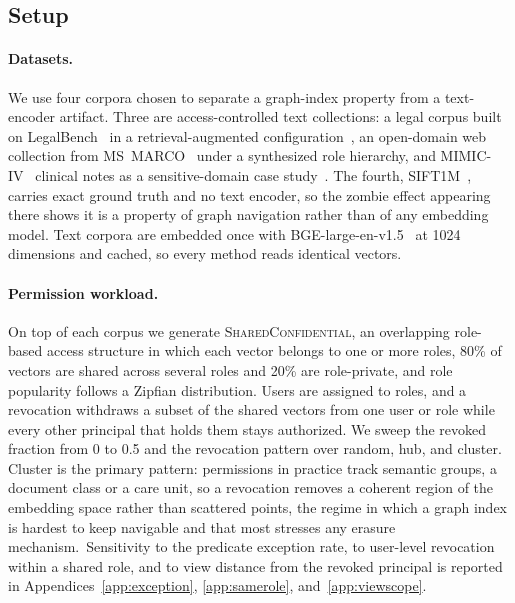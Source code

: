 \documentclass[sigconf, nonacm, review]{acmart}
\newif\ifextended\extendedtrue %
\begin{document}
\subsection{Setup}
\label{sec:eval-setup}

\paragraph{Datasets.}
We use four corpora chosen to separate a graph-index property from a
text-encoder artifact. Three are access-controlled text collections: a
legal corpus built on LegalBench~\cite{DBLP:conf/nips/GuhaNHRCKCPWRZT23} in
a retrieval-augmented configuration~\cite{DBLP:conf/icail/BarronESMA25}, an
open-domain web collection from MS~MARCO~\cite{DBLP:conf/sigir/CraswellMYCL21}
under a synthesized role hierarchy, and
MIMIC-IV~\cite{PhysioNet-mimiciv-3.1,DBLP:journals/scientificdata/JohnsonBSGSHPHMGLCM23}
clinical notes as a sensitive-domain case
study~\cite{DBLP:journals/jhir/SivarajkumarMORHLHVW24}. The fourth,
SIFT1M~\cite{DBLP:journals/pami/JegouDS11}, carries exact ground truth and
no text encoder, so the zombie effect appearing there shows it is a property
of graph navigation rather than of any embedding model. Text corpora are
embedded once with BGE-large-en-v1.5~\cite{DBLP:conf/sigir/XiaoLZMLN24} at 1024
dimensions and cached, so every method reads identical vectors.

\paragraph{Permission workload.}
On top of each corpus we generate \textsc{SharedConfidential}, an
overlapping role-based access structure in which each vector belongs to one
or more roles, 80\% of vectors are shared across several roles and 20\% are
role-private, and role popularity follows a Zipfian distribution. Users are
assigned to roles, and a revocation withdraws a subset of the shared vectors
from one user or role while every other principal that holds them stays
authorized. We sweep the revoked fraction from 0 to 0.5 and the revocation
pattern over random, hub, and cluster. Cluster is the primary pattern: permissions in practice track semantic
groups, a document class or a care unit, so a revocation removes a coherent
region of the embedding space rather than scattered points, the regime in
which a graph index is hardest to keep navigable and that most stresses any
erasure mechanism.\ifextended\ Sensitivity to the predicate exception rate, to user-level revocation within a shared role, and to view distance from the revoked principal is reported in Appendices~\ref{app:exception}, \ref{app:samerole}, and~\ref{app:viewscope}.\else\ Sensitivity to the predicate exception rate, to user-level revocation within a shared role, and to view distance from the revoked principal is reported in the extended version.\fi
\end{document}

